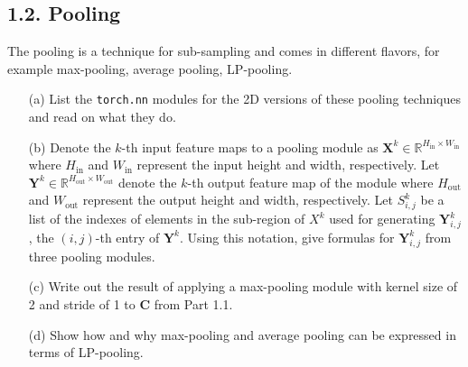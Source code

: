 \documentclass[12pt,letterpaper]{article}
\newcommand{\matr}[1]{\bm{#1}}     %
\begin{document}
 

\newpage
\subsection*{1.2. Pooling}
The pooling is a technique for sub-sampling and comes in different flavors, for example max-pooling, average pooling, LP-pooling. 
\begin{itemize}
    \item[(a)] List the \texttt{torch.nn} modules for the 2D versions of these pooling techniques and read on what they do.
    \item[(b)] Denote the $k$-th input feature maps to a pooling module as $\matr{X}^k \in \mathbb{R}^{H_{\textrm{in}}\times W_{\textrm{in}}} $ where $H_{\textrm{in}}$ and $W_{\text{in}}$ represent the input height and width, respectively. Let $\matr{Y}^k \in \mathbb{R}^{H_{\text{out}}\times W_{\textrm{out}}}$ denote the $k$-th output feature map of the module where $H_{\textrm{out}}$ and $W_{\textrm{out}}$ represent the output height and width, respectively. Let $S^{k}_{i,j}$ be a list of the indexes of elements in the sub-region of $X^k $ used for generating $\matr{Y}^k_{i,j}$, the $(i,j)$-th entry of $\matr{Y}^{k}$. 
    Using this notation, give formulas for $\matr{Y}^k_{i,j} $ from three pooling modules.
    \item[(c)] Write out the result of applying a max-pooling module with kernel size of 2 and stride of 1 to $\matr{C}$ from Part 1.1.
    \item[(d)] Show how and why max-pooling and average pooling can be expressed in terms of LP-pooling.
\end{itemize}
\end{document}
